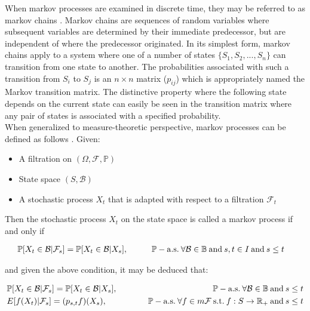 \documentclass{article}
\begin{document}
When markov processes are examined in discrete time, they may be referred to as markov chains \parencite{Debnath2015}. Markov chains are sequences of random variables where subsequent variables are determined by their immediate predecessor, but are independent of where the predecessor originated. In its simplest form, markov chains apply to a system where one of a number of states $\{S_1, S_2, ... , S_n\}$ can transition from one state to another. The probabilities associated with such a transition from $S_i$ to $S_j$ is an $n \times n$ matrix ($p_{ij}$) which is appropriately named the Markov transition matrix. The distinctive property where the following state depends on the current state can easily be seen in the transition matrix where any pair of states is associated with a specified probability. \\

When generalized to measure-theoretic perspective, markov processes can be defined as follows \parencite{Eberle2015}. Given: 

\begin{itemize}
    \item A filtration on $(\Omega, \mathcal{F},\mathbb{P})$
    \item State space $(S,\mathcal{B})$
    \item A stochastic process $X_t$ that is adapted with respect to a filtration $\mathcal{F}_t$
\end{itemize}

Then the stochastic process $X_t$ on the state space is called a markov process if and only if

\begin{align*}
    \mathbb{P}[X_t\in\mathcal{B}|\mathcal{F}_s] & = \mathbb{P}[X_t\in\mathcal{B}|X_s], \hspace{10mm} \mathbb{P}-\mathrm{a.s.}\medspace \forall \mathcal{B}\in\mathbb{B} \medspace\mathrm{and}\medspace s,t\in I \medspace\mathrm{and}\medspace s\le t
\end{align*}

and given the above condition, it may be deduced that:

\begin{align*}
    & \mathbb{P}[X_t\in\mathcal{B}|\mathcal{F}_s] = \mathbb{P}[X_t\in\mathcal{B}|X_s], \hspace{10mm} &\mathbb{P}-\mathrm{a.s.}\medspace \forall \mathcal{B}\in\mathbb{B} \medspace\mathrm{and}\medspace s\le t \\
    & E[f(X_t)|\mathcal{F}_s] = (p_{s,t}f)(X_s), \hspace{10mm} &\mathbb{P}-\mathrm{a.s.}\medspace\forall f\in m\mathcal{F}\medspace\mathrm{s.t.}\medspace f:S\rightarrow\mathbb{R}_+ \medspace\mathrm{and}\medspace s\le t
\end{align*}
\end{document}
